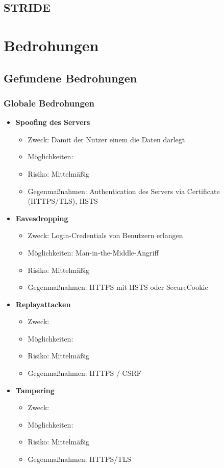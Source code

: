 \documentclass[12pt,DIV14,BCOR10mm,a4paper,twoside,parskip=half-,headsepline,headinclude,english,ngerman,bibliography=totocnumbered]{scrreprt}
\begin{document}
\section{STRIDE}
\chapter{Bedrohungen}
\section{Gefundene Bedrohungen}

\subsection{Globale Bedrohungen}

\begin{itemize}
  \item \textbf{Spoofing des Servers}
  \begin{itemize}
  \item Zweck: Damit der Nutzer einem die Daten darlegt
  \item Möglichkeiten:
  \item Risiko: Mittelmäßig
  \item Gegenmaßnahmen: Authentication des Servers via Certificate (HTTPS/TLS), HSTS
  \end{itemize}

  \item \textbf{Eavesdropping}
  \begin{itemize}
  \item Zweck: Login-Credentials von Benutzern erlangen
  \item Möglichkeiten: Man-in-the-Middle-Angriff
  \item Risiko: Mittelmäßig
  \item Gegenmaßnahmen: HTTPS mit HSTS oder SecureCookie
  \end{itemize}

  \item \textbf{Replayattacken}
  \begin{itemize}
  \item Zweck:
  \item Möglichkeiten:
  \item Risiko: Mittelmäßig
  \item Gegenmaßnahmen: HTTPS / CSRF
  \end{itemize}

  \item \textbf{Tampering}
  \begin{itemize}
  \item Zweck:
  \item Möglichkeiten:
  \item Risiko: Mittelmäßig
  \item Gegenmaßnahmen: HTTPS/TLS
  \end{itemize}


\end{itemize}
\end{document}
